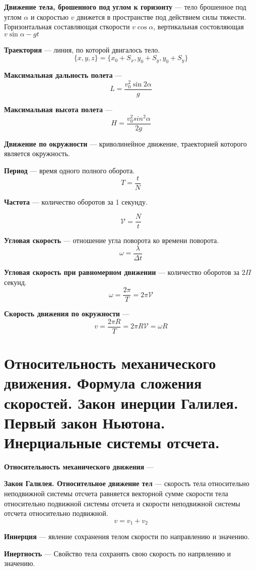 \documentclass{report}
\begin{document}
{\bf Движение тела, брошенного под углом к горизонту} ---
тело брошенное под углом $\alpha$ и скоростью $v$ движется в пространстве под 
действием силы тяжести.
Горизонтальная составляющая сткорости $v\cos{\alpha}$, вертикальная состовляющая
$v\sin{\alpha}-gt$

{}

{\bf Траектория} ---
линия, по которой двигалось тело.
$$
\{x,y,z\}=\{x_0+S_x, y_0+S_y, y_0+S_y\}
$$

{\bf Максимальная дальность полета} ---
$$
L=\frac{v^2_0\sin{2\alpha}}{g}
$$

{\bf Максимальная высота полета} ---
$$
H=\frac{v^2_0sin^2{\alpha}}{2g}
$$

{\bf Движение по окружности} ---
криволинейное движение, траекторией которого является окружность.

{\bf Период} ---
время одного полного оборота.
$$
T=\frac{t}{N}
$$

{\bf Частота} ---
количество оборотов за 1 секунду.

$$
\mathcal{V} = \frac{N}{t}
$$

{\bf Угловая скорость} ---
отношение угла поворота ко времени поворота.
$$
\omega =\frac{\lambda}{\Delta t}
$$

{\bf Угловая скорость при равномерном движении} ---
количество оборотов за $2\Pi$ секунд.
$$
\omega =\frac{2\pi}{T}=2\pi \mathcal{V}
$$

{\bf Скорость движения по окружности} ---
$$
v=\frac{2\pi R}{T}=2\pi R \mathcal{V} = \omega R
$$



\part{Относительность механического движения. 
Формула сложения скоростей. 
Закон инерции Галилея. 
Первый закон Ньютона. 
Инерциальные системы отсчета. }

{\bf Относительность механического движения} ---

{\bf Закон Галилея. Относительное движение тел} ---
скорость тела относительно неподвижной системы отсчета равняется векторной 
сумме скорости тела относительно подвижной системы отсчета и скорости 
неподвижной системы отсчета относительно подвижной.
$$
v=v_1+v_2
$$

{\bf Иннерция} ---
явление сохранения телом скорости по направлению и значению.

{\bf Инертность} ---
Свойство тела сохранять свою скорость по напрвлению и значению.
\end{document}
